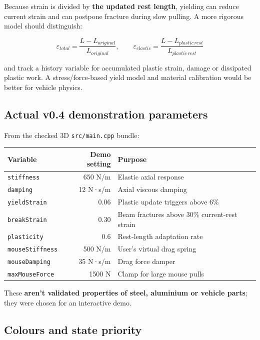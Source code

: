\documentclass[
  10pt,
  a4paper,
]{article}
\begin{document}
Because strain is divided by \textbf{the updated rest length}, yielding
can reduce current strain and can postpone fracture during slow pulling.
A more rigorous model should distinguish:

\[\varepsilon_{total}=\frac{L-L_{original}}{L_{original}},\qquad
\varepsilon_{elastic}=\frac{L-L_{plastic\,rest}}{L_{plastic\,rest}}\]

and track a history variable for accumulated plastic strain, damage or
dissipated plastic work. A stress/force-based yield model and material
calibration would be better for vehicle physics.

\subsection{Actual v0.4 demonstration
parameters}\label{actual-v0.4-demonstration-parameters}

From the checked 3D \texttt{src/main.cpp} bundle:

\begin{longtable}[]{@{}lrl@{}}
\toprule\noalign{}
Variable & Demo setting & Purpose \\
\midrule\noalign{}
\endhead
\bottomrule\noalign{}
\endlastfoot
\texttt{stiffness} & 650 N/m & Elastic axial response \\
\texttt{damping} & 12 N·s/m & Axial viscous damping \\
\texttt{yieldStrain} & 0.06 & Plastic update triggers above 6\% \\
\texttt{breakStrain} & 0.30 & Beam fractures above 30\% current-rest
strain \\
\texttt{plasticity} & 0.6 & Rest-length adaptation rate \\
\texttt{mouseStiffness} & 500 N/m & User's virtual drag spring \\
\texttt{mouseDamping} & 35 N·s/m & Drag force damper \\
\texttt{maxMouseForce} & 1500 N & Clamp for large mouse pulls \\
\end{longtable}

These \textbf{aren't validated properties of steel, aluminium or vehicle
parts}; they were chosen for an interactive demo.

\subsection{Colours and state
priority}\label{colours-and-state-priority}
\end{document}
